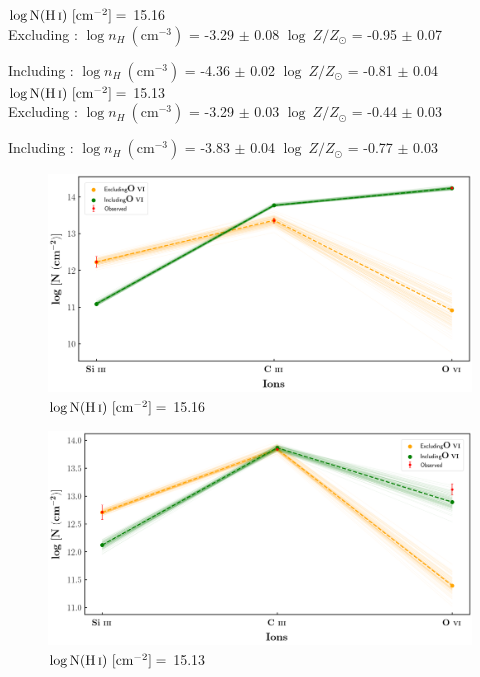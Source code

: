   
  $\log \text{N}(\ion{H}{i}) \ [\text{cm}^{-2}]=$  15.16  \\ 
  
  Excluding  : $\log n_H \ (\text{cm}^{-3})$ = -3.29 $\pm$ 0.08 \hspace{10mm} $\log \ Z/Z_\odot$ = -0.95 $\pm$ 0.07
  
  Including  : $\log n_H \ (\text{cm}^{-3})$ = -4.36 $\pm$ 0.02 \hspace{10mm} $\log \ Z/Z_\odot$ = -0.81 $\pm$ 0.04 \\
  
  $\log \text{N}(\ion{H}{i}) \ [\text{cm}^{-2}]=$  15.13  \\ 
  
  Excluding  : $\log n_H \ (\text{cm}^{-3})$ = -3.29 $\pm$ 0.03 \hspace{10mm} $\log \ Z/Z_\odot$ = -0.44 $\pm$ 0.03
  
  Including  : $\log n_H \ (\text{cm}^{-3})$ = -3.83 $\pm$ 0.04 \hspace{10mm} $\log \ Z/Z_\odot$ = -0.77 $\pm$ 0.03 
  
  \newpage
  
  \begin{figure}[!h]
      \centering
      \includegraphics[width=0.85\linewidth]{Ionisation-Modelling-Plots/h1821-z=0.224981-compII.png}
      \caption{$\log \text{N}(\ion{H}{i}) \ [\text{cm}^{-2}]=$ 15.16}
  \end{figure}
  
  \begin{figure}[!b]
      \centering
      \includegraphics[width=0.85\linewidth]{Ionisation-Modelling-Plots/h1821-z=0.224981-compIV.png}
      \caption{$\log \text{N}(\ion{H}{i}) \ [\text{cm}^{-2}]=$ 15.13}
  \end{figure}
  
